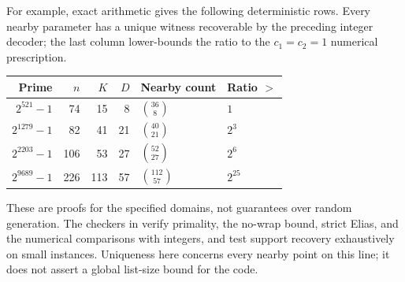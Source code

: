 For example, exact arithmetic gives the following deterministic rows.
Every nearby parameter has a unique witness recoverable by the preceding
integer decoder; the last column lower-bounds the ratio to the
$c_1=c_2=1$ numerical prescription.
\begin{center}
\begin{tabular}{@{}rrrrll@{}}
\toprule
Prime & $n$ & $K$ & $D$ & Nearby count & Ratio $>$\\
\midrule
$2^{521}-1$&74&15&8&$\binom{36}{8}$&$1$\\
$2^{1279}-1$&82&41&21&$\binom{40}{21}$&$2^3$\\
$2^{2203}-1$&106&53&27&$\binom{52}{27}$&$2^6$\\
$2^{9689}-1$&226&113&57&$\binom{112}{57}$&$2^{25}$\\
\bottomrule
\end{tabular}
\end{center}
These are proofs for the specified domains, not guarantees over random
generation. The checkers in 
verify primality, the no-wrap bound, strict Elias, and the numerical
comparisons with integers, and test support recovery exhaustively on
small instances. Uniqueness here concerns every nearby point on this
line; it does not assert a global list-size bound for the code.

